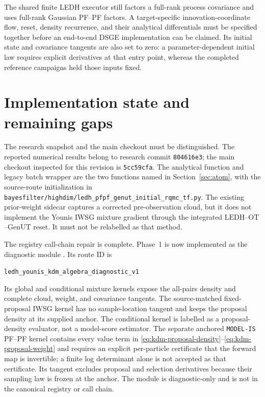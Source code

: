 \documentclass[11pt]{article}
\newcommand{\LEDH}{\ensuremath{\mathrm{LEDH}}}
\newcommand{\GenUT}{\ensuremath{\mathrm{GenUT}}}
\newcommand{\OT}{\ensuremath{\mathrm{OT}}}
\begin{document}
The shared finite
LEDH executor still factors a full-rank process covariance and uses full-rank
Gaussian PF--PF factors.  A target-specific innovation-coordinate flow,
reset, density recurrence, and their analytical differentials must be
specified together before an end-to-end DSGE implementation can be claimed.
Its initial state and covariance tangents are also set to zero: a
parameter-dependent initial law requires explicit derivatives at that entry
point, whereas the completed reference campaigns held those inputs fixed.

\section{Implementation state and remaining gaps}
\label{sec:implementation}

The research snapshot and the main checkout must be distinguished. The
reported numerical results belong to research commit \texttt{804616e3}; the
main checkout inspected for this revision is \texttt{5cc59cfa}. The analytical
function and legacy batch wrapper are the two functions named in
Section~\ref{sec:atom}, with the source-route initialization in
\texttt{bayesfilter/highdim/ledh\_pfpf\_genut\_initial\_rqmc\_tf.py}.  The
existing prior-weight sidecar captures a corrected pre-observation cloud, but
it does not implement the Younis IWSG mixture gradient through the integrated
\LEDH{}--\OT{}--\GenUT{} reset.  It must not be relabelled as that method.

The registry call-chain repair is complete.  Phase~1 is now implemented as the
diagnostic module
.  Its route ID is
\begin{center}
\texttt{ledh\_younis\_kdm\_algebra\_}\texttt{diagnostic\_v1}
\end{center}
Its global and
conditional mixture kernels expose the all-pairs density and complete cloud,
weight, and covariance tangents.  The source-matched fixed-proposal IWSG
kernel has no sample-location tangent and keeps the proposal density at its
supplied anchor.  The conditional kernel is labelled as a proposal-density
evaluator, not a model-score estimator.  The separate anchored
\texttt{MODEL-IS} PF--PF kernel contains every value term in
\eqref{eq:kdm-proposal-density}--\eqref{eq:kdm-proposal-weight} and requires
an explicit per-particle certificate that the forward map is invertible; a
finite log determinant alone is not accepted as that certificate.  Its
tangent excludes proposal and selection derivatives because their sampling
law is frozen at the anchor.  The module is diagnostic-only and is not in the
canonical registry or call chain.
\end{document}
